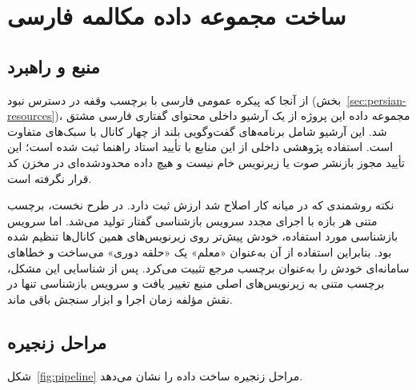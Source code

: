 \section{ساخت مجموعه داده مکالمه فارسی}
\label{sec:data}

\subsection{منبع و راهبرد}

از آنجا که پیکره عمومی فارسی با برچسب وقفه در دسترس نبود
(بخش~\ref{sec:persian-resources})، مجموعه داده این پروژه از یک آرشیو داخلی
محتوای گفتاری فارسی مشتق شد. این آرشیو شامل برنامه‌های گفت‌وگویی بلند از
چهار کانال با سبک‌های متفاوت است. استفاده پژوهشی داخلی از این منابع با
تأیید استاد راهنما ثبت شده است؛ این تأیید مجوز بازنشر صوت یا زیرنویس خام
نیست و هیچ داده محدودشده‌ای در مخزن کد قرار نگرفته است.

نکته روشمندی که در میانه کار اصلاح شد ارزش ثبت دارد. در طرح نخست، برچسب
متنی هر بازه با اجرای مجدد سرویس بازشناسی گفتار تولید می‌شد. اما سرویس
بازشناسی مورد استفاده، خودش پیش‌تر روی زیرنویس‌های همین کانال‌ها تنظیم شده
بود. بنابراین استفاده از آن به‌عنوان «معلم» یک «حلقه دوری» می‌ساخت و
خطاهای سامانه‌ای خودش را به‌عنوان برچسب مرجع تثبیت می‌کرد. پس از شناسایی این
مشکل، برچسب متنی به زیرنویس‌های اصلی منبع تغییر یافت و سرویس بازشناسی تنها
در نقش مؤلفه زمان اجرا و ابزار سنجش باقی ماند.

\subsection{مراحل زنجیره}

شکل~\ref{fig:pipeline} مراحل زنجیره ساخت داده را نشان می‌دهد.

